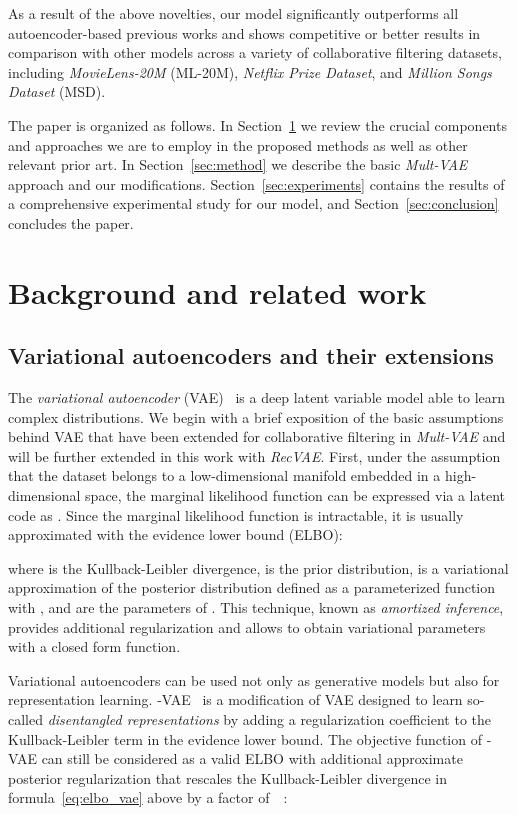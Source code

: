 \documentclass[sigconf,authorversion]{acmart}
\begin{document}
As a result of the above novelties, our model significantly outperforms all autoencoder-based previous works and shows competitive or better results in comparison with other models across a variety of collaborative filtering datasets, including \emph{MovieLens-20M} (ML-20M), \emph{Netflix Prize Dataset}, and \emph{Million Songs Dataset} (MSD).

The paper is organized as follows. In Section~\ref{sec:background} we review the crucial components and approaches we are to employ in the proposed methods as well as other relevant prior art.
In Section~\ref{sec:method} we describe the basic \emph{Mult-VAE} approach and our modifications. Section~\ref{sec:experiments} contains the results of a comprehensive experimental study for our model, 
and Section~\ref{sec:conclusion} concludes the paper.

\section{Background and related work}\label{sec:background}

\subsection{Variational autoencoders and their extensions}\label{sec:vae}

The \emph{variational autoencoder} (VAE)~\cite{DBLP:journals/corr/KingmaW13,DBLP:conf/icml/RezendeMW14} is a deep latent variable model able to learn complex distributions. We begin with a brief exposition of the basic assumptions behind VAE that have been extended for collaborative filtering in \emph{Mult-VAE} and will be further extended in this work with \emph{RecVAE}. First, under the assumption that the dataset belongs to a low-dimensional manifold embedded in a high-dimensional space, the marginal likelihood function can be expressed via a latent code  as . Since the marginal likelihood function is intractable, it is usually approximated with the evidence lower bound (ELBO):


\noindent
where  is the Kullback-Leibler divergence,  is the prior distribution,  is a variational approximation of the posterior distribution defined as a parameterized function with , and  are the parameters of . This technique, known as \emph{amortized inference}, provides additional regularization and allows to obtain variational parameters with a closed form function. 

Variational autoencoders can be used not only as generative models but also for representation learning. -VAE~\cite{higgins2017beta} is a modification of VAE designed to learn so-called \emph{disentangled representations} by adding a regularization coefficient to the Kullback-Leibler term in the evidence lower bound. The objective function of -VAE can still be considered as a valid ELBO with additional approximate posterior regularization that rescales the Kullback-Leibler divergence in formula~\eqref{eq:elbo_vae} above by a factor of~~\cite{hoffman2017beta,DBLP:conf/icml/MathieuRST19}:
\end{document}
